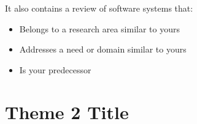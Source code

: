 It also contains a review of software systems that:
%
%
\begin{itemize}
   \item Belongs to a research area similar to yours
   \item Addresses a need or domain similar to yours
   \item Is your predecessor
\end{itemize}

\section{Theme 2 Title}















